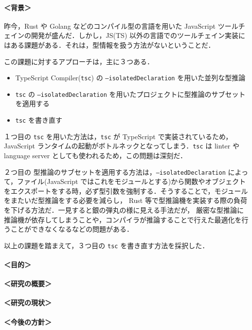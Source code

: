 \documentclass{classes/tyukan}
\begin{document}
\paragraph{＜背景＞}
昨今，Rust や Golang などのコンパイル型の言語を用いた JavaScript
ツールチェインの開発が盛んだ．しかし，JS(TS) 以外の言語でのツールチェイン実装にはある課題がある．それは，型情報を扱う方法がないということだ．

この課題に対するアプローチは，主に３つある．

\begin{itemize}
  \item TypeScript Compiler(\texttt{tsc}) の
    \texttt{--isolatedDeclaration} を用いた並列な型推論
  \item \texttt{tsc} の \texttt{--isolatedDeclaration} を用いたプロジェクトに型推論のサブセットを適用する
  \item \texttt{tsc} を書き直す
\end{itemize}

１つ目の \texttt{tsc} を用いた方法は，\texttt{tsc} が TypeScript で実装されているため，
JavaScript ランタイムの起動がボトルネックとなってしまう．\texttt{tsc} は linter や language
server としても使われるため，この問題は深刻だ．

２つ目の 型推論のサブセットを適用する方法は，\texttt{--isolatedDeclaration}
によって，ファイル(JavaScript
ではこれをモジュールとする)から関数やオブジェクトをエクスポートをする時，必ず型引数を強制する．そうすることで，モジュールをまたいだ型推論をする必要を減らし，
Rust
等で型推論機を実装する際の負荷を下げる方法だ．一見すると銀の弾丸の様に見える手法だが，
厳密な型推論に推論機が依存してしまうことや，コンパイラが推論することで行えた最適化を行うことができなくなるなどの問題がある．

以上の課題を踏まえて，３つ目の \texttt{tsc} を書き直す方法を採択した．

\paragraph{＜目的＞}

\paragraph{＜研究の概要＞}

\paragraph{＜研究の現状＞}

\paragraph{＜今後の方針＞}
\end{document}
